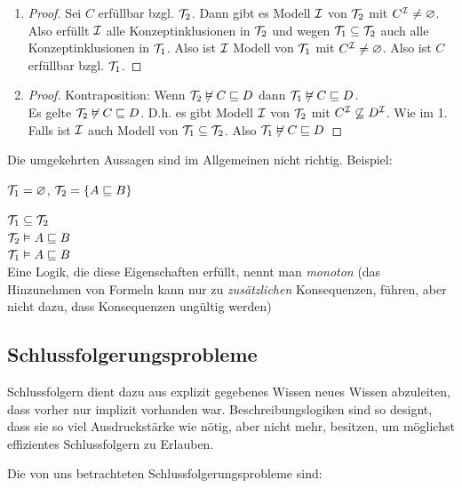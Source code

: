 \begin{enumerate}
\def\labelenumi{\arabic{enumi}.}
  \item \begin{proof} Sei $C$ erfüllbar bzgl. $\mathcal{T}_{2}$. Dann gibt es Modell $\mathcal{I}$ von $\mathcal{T}_{2}$ mit $C^{\mathcal{I}} \neq \varnothing$. Also erfüllt $\mathcal{I}$ alle Konzeptinklusionen in $\mathcal{T}_{2}$ und wegen $\mathcal{T}_{1} \subseteq \mathcal{T}_{2}$ auch alle Konzeptinklusionen in $\mathcal{T}_{1}$. Also ist $\mathcal{I}$ Modell von $\mathcal{T}_1$ mit $C^{\mathcal{I}} \neq \varnothing$. Also ist $C$ erfüllbar bzgl. $\mathcal{T}_1$. \end{proof}
  \item \begin{proof} Kontraposition: Wenn $\mathcal{T}_2 \not\vDash C \sqsubseteq D$ dann $\mathcal{T}_1 \not\vDash C \sqsubseteq D$. \\
  Es gelte $\mathcal{T}_2 \not\vDash C \sqsubseteq D$. D.h. es gibt Modell $\mathcal{I}$ von $\mathcal{T}_2$ mit $C^{\mathcal{I}} \not\subseteq D^{\mathcal{I}}$. Wie im 1. Falls ist $\mathcal{I}$ auch Modell von $\mathcal{T}_1 \subseteq \mathcal{T}_2$. Also $\mathcal{T}_1 \not\vDash C \sqsubseteq D$\end{proof}
\end{enumerate}

Die umgekehrten Aussagen sind im Allgemeinen nicht richtig. Beispiel:

$\mathcal{T}_1 = \varnothing$, $\mathcal{T}_2 = \{A \sqsubseteq B\}$ 

$\mathcal{T}_1 \subseteq \mathcal{T}_2$ \\
$\mathcal{T}_2 \vDash A \sqsubseteq B$\\
$\mathcal{T}_1 \vDash A \sqsubseteq B$\\

Eine Logik, die diese Eigenschaften erfüllt, nennt man \emph{monoton} (das Hinzunehmen von Formeln kann nur zu \emph{zusätzlichen} Konsequenzen, führen, aber nicht dazu, dass Konsequenzen ungültig werden)

\subsection{Schlussfolgerungsprobleme}\label{schlussfolgerungsprobleme}

Schlussfolgern dient dazu aus explizit gegebenes Wissen neues Wissen abzuleiten, dass vorher nur implizit vorhanden war. Beschreibungslogiken sind so designt, dass sie so viel Ausdruckstärke wie nötig, aber nicht mehr, besitzen, um möglichst effizientes Schlussfolgern zu Erlauben.

Die von uns betrachteten Schlussfolgerungsprobleme sind:

